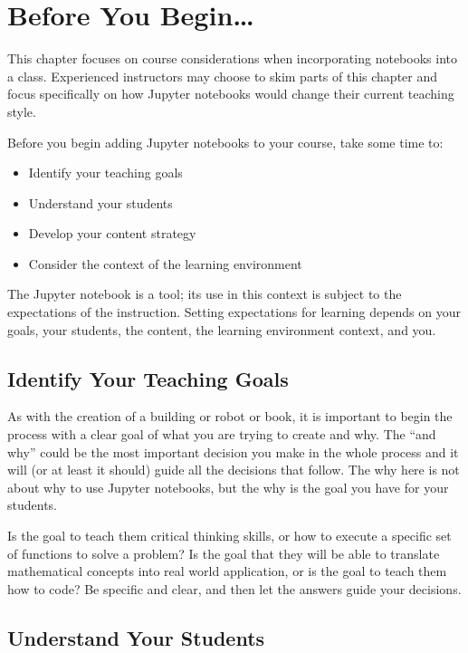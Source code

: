 \documentclass[]{book}
\providecommand{\tightlist}{%
  \setlength{\itemsep}{0pt}\setlength{\parskip}{0pt}}
\begin{document}
\section{Before You Begin\ldots{}}\label{before-you-begin}

This chapter focuses on course considerations when incorporating
notebooks into a class. Experienced instructors may choose to skim parts
of this chapter and focus specifically on how Jupyter notebooks would
change their current teaching style.

Before you begin adding Jupyter notebooks to your course, take some time
to:

\begin{itemize}
\tightlist
\item
  Identify your teaching goals
\item
  Understand your students
\item
  Develop your content strategy
\item
  Consider the context of the learning environment
\end{itemize}

The Jupyter notebook is a tool; its use in this context is subject to
the expectations of the instruction. Setting expectations for learning
depends on your goals, your students, the content, the learning
environment context, and you.

\subsection{Identify Your Teaching
Goals}\label{identify-your-teaching-goals}

As with the creation of a building or robot or book, it is important to
begin the process with a clear goal of what you are trying to create and
why. The ``and why'' could be the most important decision you make in
the whole process and it will (or at least it should) guide all the
decisions that follow. The why here is not about why to use Jupyter
notebooks, but the why is the goal you have for your students.

Is the goal to teach them critical thinking skills, or how to execute a
specific set of functions to solve a problem? Is the goal that they will
be able to translate mathematical concepts into real world application,
or is the goal to teach them how to code? Be specific and clear, and
then let the answers guide your decisions.

\subsection{Understand Your Students}\label{understand-your-students}
\end{document}
